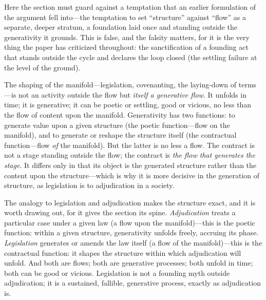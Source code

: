 Here the section must guard against a temptation that an earlier formulation of the argument fell into---the temptation to set ``structure'' against ``flow'' as a separate, deeper stratum, a foundation laid once and standing outside the generativity it grounds. This is false, and the falsity matters, for it is the very thing the paper has criticized throughout: the sanctification of a founding act that stands outside the cycle and declares the loop closed (the settling failure at the level of the ground).

\begin{claim}
The shaping of the manifold---legislation, covenanting, the laying-down of terms---is not an activity outside the flow but \emph{itself a generative flow}. It unfolds in time; it is generative; it can be poetic or settling, good or vicious, no less than the flow of content upon the manifold. Generativity has two functions: to generate value upon a given structure (the poetic function---flow on the manifold), and to generate or reshape the structure itself (the contractual function---flow \emph{of} the manifold). But the latter is no less a flow. The contract is not a stage standing outside the flow; the contract is \emph{the flow that generates the stage}. It differs only in that its object is the generated structure rather than the content upon the structure---which is why it is more decisive in the generation of structure, as legislation is to adjudication in a society.
\end{claim}

The analogy to legislation and adjudication makes the structure exact, and it is worth drawing out, for it gives the section its spine. \emph{Adjudication} treats a particular case under a given law (a flow upon the manifold)---this is the poetic function: within a given structure, generativity unfolds freely, accruing its phase. \emph{Legislation} generates or amends the law itself (a flow of the manifold)---this is the contractual function: it shapes the structure within which adjudication will unfold. And both are flows; both are generative processes; both unfold in time; both can be good or vicious. Legislation is not a founding myth outside adjudication; it is a sustained, fallible, generative process, exactly as adjudication is. 

